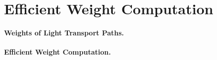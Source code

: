 \section{Efficient Weight Computation}
\label{sec:weight_computation}


\paragraph{Weights of Light Transport Paths.}

%


\paragraph{Efficient Weight Computation.}

